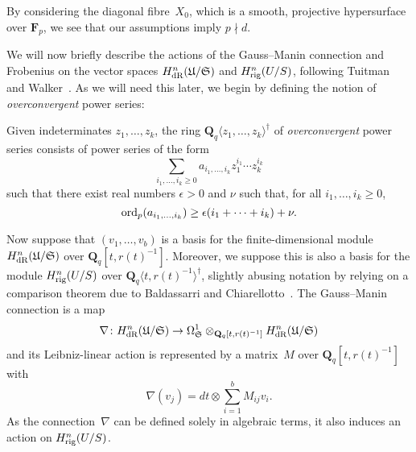 \begin{rem}
By considering the diagonal fibre~$X_0$, which is a smooth, 
projective hypersurface over $\mathbf{F}_p$, we see that our 
assumptions imply $p \nmid d$.
\end{rem}

We will now briefly describe the actions of the Gauss--Manin connection 
and Frobenius on the vector spaces $H_{\text{dR}}^{n}(\mathfrak{U}/\mathfrak{S})$ 
and $H_{\text{rig}}^{n}(U/S)$, following Tuitman~\citep[\S 3.4.2, \S 3.6.1]{Tuitman2011}
and Walker~\citep[\S 3.2.2.2]{Walker2009}.  As we will need this later, 
we begin by defining the notion of \emph{overconvergent} power series:

\begin{defn} \label{defn:Overconvergence}
Given indeterminates $z_1, \dotsc, z_k$, 
the ring $\mathbf{Q}_q \langle z_1, \dotsc, z_k \rangle^{\dagger}$ of 
\emph{overconvergent} power series consists of power series of the form 
\begin{equation*}
\sum_{i_1,\dotsc,i_k \geq 0} a_{i_1,\dotsc,i_k} z_1^{i_1} \dotsm z_k^{i_k}
\end{equation*}
such that there exist real numbers $\epsilon > 0$ and $\nu$ 
such that, for all $i_1, \dotsc, i_k \geq 0$, 
\begin{equation*}
\operatorname{ord}_p (a_{i_1,\dotsc,i_k}) \geq \epsilon(i_1 + \dotsb + i_k) + \nu.
\end{equation*}
\end{defn}

Now suppose that $(v_1,\dotsc,v_b)$ is a basis for the finite-dimensional 
module $H_{\text{dR}}^{n}(\mathfrak{U}/\mathfrak{S})$ over 
$\mathbf{Q}_q[t,r(t)^{-1}]$.  Moreover, we suppose this is also a basis 
for the module $H_{\text{rig}}^{n}(U/S)$ over 
$\mathbf{Q}_q\langle t, r(t)^{-1} \rangle^{\dagger}$, slightly abusing 
notation by relying on a comparison theorem due to Baldassarri and 
Chiarellotto~\citep{BalChi94}.  The Gauss--Manin connection is a map 
\begin{equation*}
\nabla \colon H_{\text{dR}}^{n}(\mathfrak{U}/\mathfrak{S}) 
    \rightarrow \Omega_{\mathfrak{S}}^{1}
    \otimes_{\mathbf{Q}_q[t,r(t)^{-1}]} H_{\text{dR}}^{n}(\mathfrak{U}/\mathfrak{S})
\end{equation*}
and its Leibniz-linear action is represented by a matrix~$M$ over 
$\mathbf{Q}_q[t,r(t)^{-1}]$ with 
\begin{equation*}
\nabla(v_j) = dt \otimes \sum_{i=1}^{b} M_{ij} v_i.
\end{equation*}
As the connection~$\nabla$ can be defined solely in algebraic terms, 
it also induces an action on $H_{\text{rig}}^{n}(U/S)$.

